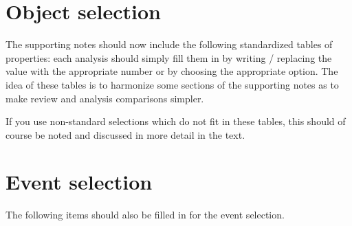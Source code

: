 \documentclass[NOTE, atlasdraft=true, texlive=2016, USenglish]{\ATLASLATEXPATH atlasdoc}
\author{ATLAS EXOT Group}
\begin{document}
\maketitle

\tableofcontents



\section{Object selection}
The supporting notes should now include the following standardized tables of properties: each analysis should simply fill them
in by writing / replacing the value with the appropriate number or by choosing the appropriate option.
The idea of these tables is to harmonize some sections of the supporting notes as to make review and analysis comparisons simpler.

If you use non-standard selections which do not fit in these tables, this should of course be noted and discussed in more detail in the text.
 









\section{Event selection}
The following items should also be filled in for the event selection.


\end{document}

